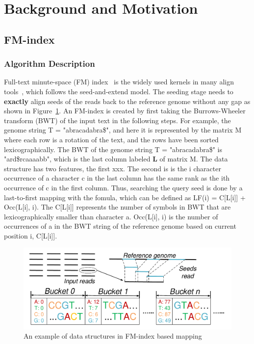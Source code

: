 \documentclass[9pt,conference]{IEEEtran}
\begin{document}
\section{Background and Motivation}
\subsection{FM-index}
\subsubsection{Algorithm Description}
Full-text minute-space (FM) index~\cite{bwt} is the widely used kernels in many align tools~\cite{ahmed2016comparison}, which follows the seed-and-extend model. The seeding stage needs to \textbf{exactly} align seeds of the reads back to the reference genome without any gap as shown in Figure~\ref{fig:algo-fm}. An FM-index is created by first taking the Burrows-Wheeler transform (BWT) of the input text in the following steps. For example,  the genome string T = "abracadabra\$",  and here it is represented by the matrix M where each row is a rotation of the text, and the rows have been sorted lexicographically.  The BWT of the genome string T = "abracadabra\$" is "ard\$rcaaaabb", which is the last column labeled \textbf{L} of matrix M. The data structure has two features, the first xxx. The second is is the i character occurrence of a character c in the last column has the same rank as the ith occurrence of c in the first column. Thus, searching the query seed is done by a last-to-first mapping with the fomula, which can be defined as LF(i) = C[L[i]] + Occ(L[i], i). The C[L[i]] represents the number of symbols in BWT that are lexicographically smaller than character a. Occ(L[i], i) is the number of occurrences of a in the BWT string of the reference genome based on current position i, C[L[i]].
\begin{figure}[htbp]
\centering
\includegraphics[scale=0.30]{Conference-LaTeX-template_10-17-19/fig/algo-fm.pdf}
\caption{An example of data structures in FM-index based mapping}
\label{fig:algo-fm}
\end{figure}
\end{document}
